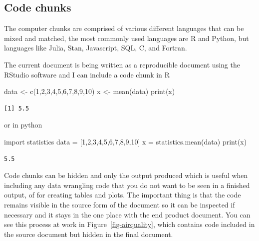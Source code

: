 \documentclass[
  letterpaper,
  DIV=11,
  numbers=noendperiod]{scrreprt}
\newenvironment{Shaded}{\begin{snugshade}}{\end{snugshade}}
\newcommand{\BuiltInTok}[1]{\textcolor[rgb]{0.00,0.23,0.31}{#1}}
\newcommand{\DecValTok}[1]{\textcolor[rgb]{0.68,0.00,0.00}{#1}}
\newcommand{\FunctionTok}[1]{\textcolor[rgb]{0.28,0.35,0.67}{#1}}
\newcommand{\ImportTok}[1]{\textcolor[rgb]{0.00,0.46,0.62}{#1}}
\newcommand{\NormalTok}[1]{\textcolor[rgb]{0.00,0.23,0.31}{#1}}
\newcommand{\OperatorTok}[1]{\textcolor[rgb]{0.37,0.37,0.37}{#1}}
\newcommand{\OtherTok}[1]{\textcolor[rgb]{0.00,0.23,0.31}{#1}}
\begin{document}
\subsection{Code chunks}\label{code-chunks}

The computer chunks are comprised of various different languages that
can be mixed and matched, the most commonly used languages are R and
Python, but languages like Julia, Stan, Javascript, SQL, C, and Fortran.

The current document is being written as a reproducible document using
the RStudio software and I can include a code chunk in R

\begin{Shaded}
\begin{Highlighting}[]
\NormalTok{data }\OtherTok{\textless{}{-}} \FunctionTok{c}\NormalTok{(}\DecValTok{1}\NormalTok{,}\DecValTok{2}\NormalTok{,}\DecValTok{3}\NormalTok{,}\DecValTok{4}\NormalTok{,}\DecValTok{5}\NormalTok{,}\DecValTok{6}\NormalTok{,}\DecValTok{7}\NormalTok{,}\DecValTok{8}\NormalTok{,}\DecValTok{9}\NormalTok{,}\DecValTok{10}\NormalTok{)}
\NormalTok{x }\OtherTok{\textless{}{-}} \FunctionTok{mean}\NormalTok{(data)}
\FunctionTok{print}\NormalTok{(x)}
\end{Highlighting}
\end{Shaded}

\begin{verbatim}
[1] 5.5
\end{verbatim}

or in python

\begin{Shaded}
\begin{Highlighting}[]
\ImportTok{import}\NormalTok{ statistics}
\NormalTok{data }\OperatorTok{=}\NormalTok{ [}\DecValTok{1}\NormalTok{,}\DecValTok{2}\NormalTok{,}\DecValTok{3}\NormalTok{,}\DecValTok{4}\NormalTok{,}\DecValTok{5}\NormalTok{,}\DecValTok{6}\NormalTok{,}\DecValTok{7}\NormalTok{,}\DecValTok{8}\NormalTok{,}\DecValTok{9}\NormalTok{,}\DecValTok{10}\NormalTok{]}
\NormalTok{x }\OperatorTok{=}\NormalTok{ statistics.mean(data)}
\BuiltInTok{print}\NormalTok{(x)}
\end{Highlighting}
\end{Shaded}

\begin{verbatim}
5.5
\end{verbatim}

Code chunks can be hidden and only the output produced which is useful
when including any data wrangling code that you do not want to be seen
in a finished output, of for creating tables and plots. The important
thing is that the code remains visible in the source form of the
document so it can be inspected if necessary and it stays in the one
place with the end product document. You can see this process at work in
Figure~\ref{fig-airquality}, which contains code included in the source
document but hidden in the final document.
\end{document}
